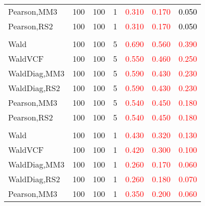 \documentclass[
]{article}
\begin{document}
\begin{table}[H]
{\begin{tabular}[t]{lrrrrrr}
\hspace{1em}Pearson,MM3 & 100 & 100 & 1 & \textcolor{red}{0.310} & \textcolor{red}{0.170} & \textcolor{black}{0.050}\\
\hspace{1em}Pearson,RS2 & 100 & 100 & 1 & \textcolor{red}{0.310} & \textcolor{red}{0.170} & \textcolor{black}{0.050}\\
\addlinespace[0.3em]
\multicolumn{7}{l}{\textbf{1F 15V}}\\
\hspace{1em}Wald & 100 & 100 & 5 & \textcolor{red}{0.690} & \textcolor{red}{0.560} & \textcolor{red}{0.390}\\
\hspace{1em}WaldVCF & 100 & 100 & 5 & \textcolor{red}{0.550} & \textcolor{red}{0.460} & \textcolor{red}{0.250}\\
\hspace{1em}WaldDiag,MM3 & 100 & 100 & 5 & \textcolor{red}{0.590} & \textcolor{red}{0.430} & \textcolor{red}{0.230}\\
\hspace{1em}WaldDiag,RS2 & 100 & 100 & 5 & \textcolor{red}{0.590} & \textcolor{red}{0.430} & \textcolor{red}{0.230}\\
\hspace{1em}Pearson,MM3 & 100 & 100 & 5 & \textcolor{red}{0.540} & \textcolor{red}{0.450} & \textcolor{red}{0.180}\\
\hspace{1em}Pearson,RS2 & 100 & 100 & 5 & \textcolor{red}{0.540} & \textcolor{red}{0.450} & \textcolor{red}{0.180}\\
\addlinespace[0.3em]
\multicolumn{7}{l}{\textbf{2F 10V}}\\
\hspace{1em}Wald & 100 & 100 & 1 & \textcolor{red}{0.430} & \textcolor{red}{0.320} & \textcolor{red}{0.130}\\
\hspace{1em}WaldVCF & 100 & 100 & 1 & \textcolor{red}{0.420} & \textcolor{red}{0.300} & \textcolor{red}{0.100}\\
\hspace{1em}WaldDiag,MM3 & 100 & 100 & 1 & \textcolor{red}{0.260} & \textcolor{red}{0.170} & \textcolor{red}{0.060}\\
\hspace{1em}WaldDiag,RS2 & 100 & 100 & 1 & \textcolor{red}{0.260} & \textcolor{red}{0.180} & \textcolor{red}{0.070}\\
\hspace{1em}Pearson,MM3 & 100 & 100 & 1 & \textcolor{red}{0.350} & \textcolor{red}{0.200} & \textcolor{red}{0.060}\\

\end{tabular}}
\end{table}
\end{document}
